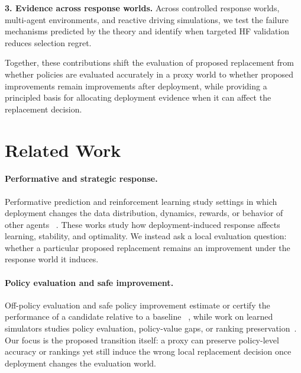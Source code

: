 \documentclass{article}
\begin{document}
\smallskip
\noindent\textbf{3. Evidence across response worlds.}
Across controlled response worlds, multi-agent environments, and reactive
driving simulations, we test the failure mechanisms predicted by the
theory and identify when targeted HF validation reduces selection regret.

\smallskip

Together, these contributions shift the evaluation of proposed replacement from
whether policies are evaluated accurately in a proxy world to whether proposed
improvements remain improvements after deployment, while providing a principled
basis for allocating deployment evidence when it can affect the replacement decision.

\section{Related Work}

\paragraph{Performative and strategic response.}
Performative prediction and reinforcement learning study settings in which
deployment changes the data distribution, dynamics, rewards, or behavior of
other agents
~\citep{perdomo2020performative,mandal2023performative,rank2024performative,
mandal2025linear,gois2025performative,multiagentperformative2022}.
These works study how deployment-induced response affects learning, stability,
and optimality. We instead ask a local evaluation question: whether a
particular proposed replacement remains an improvement under the response
world it induces.

\paragraph{Policy evaluation and safe improvement.}
Off-policy evaluation and safe policy improvement estimate or certify the
performance of a candidate relative to a baseline
~\citep{jiang2016doubly,thomas2015hcpi,laroche2019spibb}, while
work on learned simulators studies policy evaluation, policy-value gaps,
or ranking preservation~\citep{worldgym2025,policyaware2026}.
Our focus is the proposed transition itself: a proxy can preserve policy-level
accuracy or rankings yet still induce the wrong local replacement decision
once deployment changes the evaluation world.
\end{document}

